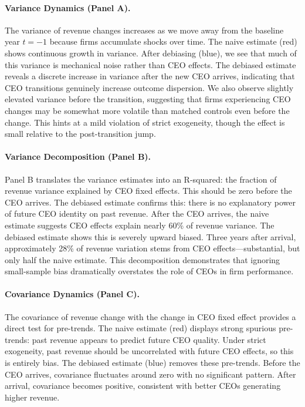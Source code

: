 \documentclass[11pt,a4paper]{article}
\begin{document}
\paragraph{Variance Dynamics (Panel A).} The variance of revenue changes increases as we move away from the baseline year $t=-1$ because firms accumulate shocks over time. The naive estimate (red) shows continuous growth in variance. After debiasing (blue), we see that much of this variance is mechanical noise rather than CEO effects. The debiased estimate reveals a discrete increase in variance after the new CEO arrives, indicating that CEO transitions genuinely increase outcome dispersion. We also observe slightly elevated variance before the transition, suggesting that firms experiencing CEO changes may be somewhat more volatile than matched controls even before the change. This hints at a mild violation of strict exogeneity, though the effect is small relative to the post-transition jump.

\paragraph{Variance Decomposition (Panel B).} Panel B translates the variance estimates into an R-squared: the fraction of revenue variance explained by CEO fixed effects. This should be zero before the CEO arrives. The debiased estimate confirms this: there is no explanatory power of future CEO identity on past revenue. After the CEO arrives, the naive estimate suggests CEO effects explain nearly 60\% of revenue variance. The debiased estimate shows this is severely upward biased. Three years after arrival, approximately 28\% of revenue variation stems from CEO effects---substantial, but only half the naive estimate. This decomposition demonstrates that ignoring small-sample bias dramatically overstates the role of CEOs in firm performance.

\paragraph{Covariance Dynamics (Panel C).} The covariance of revenue change with the change in CEO fixed effect provides a direct test for pre-trends. The naive estimate (red) displays strong spurious pre-trends: past revenue appears to predict future CEO quality. Under strict exogeneity, past revenue should be uncorrelated with future CEO effects, so this is entirely bias. The debiased estimate (blue) removes these pre-trends. Before the CEO arrives, covariance fluctuates around zero with no significant pattern. After arrival, covariance becomes positive, consistent with better CEOs generating higher revenue.
\end{document}
